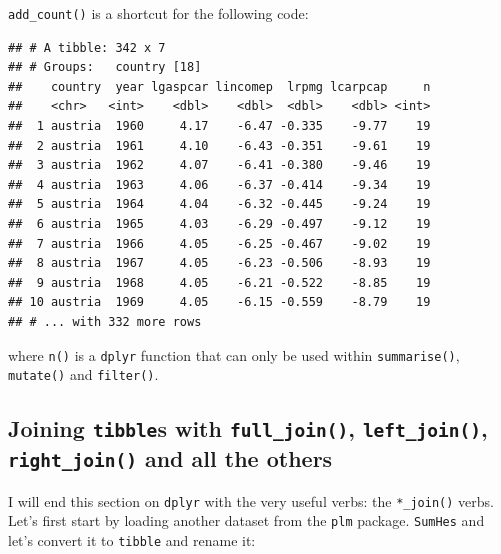 \documentclass[]{gitbook}
\newenvironment{Shaded}{\begin{snugshade}}{\end{snugshade}}
\newcommand{\DataTypeTok}[1]{\textcolor[rgb]{0.13,0.29,0.53}{#1}}
\newcommand{\KeywordTok}[1]{\textcolor[rgb]{0.13,0.29,0.53}{\textbf{#1}}}
\newcommand{\NormalTok}[1]{#1}
\newcommand{\OperatorTok}[1]{\textcolor[rgb]{0.81,0.36,0.00}{\textbf{#1}}}
\newcommand{\StringTok}[1]{\textcolor[rgb]{0.31,0.60,0.02}{#1}}
\theoremstyle{definition}
\theoremstyle{definition}
\theoremstyle{definition}
\theoremstyle{remark}
\begin{document}
\texttt{add\_count()} is a shortcut for the following code:

\begin{Shaded}
\end{Shaded}

\begin{verbatim}
## # A tibble: 342 x 7
## # Groups:   country [18]
##    country  year lgaspcar lincomep  lrpmg lcarpcap     n
##    <chr>   <int>    <dbl>    <dbl>  <dbl>    <dbl> <int>
##  1 austria  1960     4.17    -6.47 -0.335    -9.77    19
##  2 austria  1961     4.10    -6.43 -0.351    -9.61    19
##  3 austria  1962     4.07    -6.41 -0.380    -9.46    19
##  4 austria  1963     4.06    -6.37 -0.414    -9.34    19
##  5 austria  1964     4.04    -6.32 -0.445    -9.24    19
##  6 austria  1965     4.03    -6.29 -0.497    -9.12    19
##  7 austria  1966     4.05    -6.25 -0.467    -9.02    19
##  8 austria  1967     4.05    -6.23 -0.506    -8.93    19
##  9 austria  1968     4.05    -6.21 -0.522    -8.85    19
## 10 austria  1969     4.05    -6.15 -0.559    -8.79    19
## # ... with 332 more rows
\end{verbatim}

where \texttt{n()} is a \texttt{dplyr} function that can only be used
within \texttt{summarise()}, \texttt{mutate()} and \texttt{filter()}.

\hypertarget{joining-tibbles-with-full_join-left_join-right_join-and-all-the-others}{%
\subsection{\texorpdfstring{Joining \texttt{tibble}s with
\texttt{full\_join()}, \texttt{left\_join()}, \texttt{right\_join()} and
all the
others}{Joining tibbles with full\_join(), left\_join(), right\_join() and all the others}}\label{joining-tibbles-with-full_join-left_join-right_join-and-all-the-others}}

I will end this section on \texttt{dplyr} with the very useful verbs:
the \texttt{*\_join()} verbs. Let's first start by loading another
dataset from the \texttt{plm} package. \texttt{SumHes} and let's convert
it to \texttt{tibble} and rename it:

\begin{Shaded}
\end{Shaded}
\end{document}
